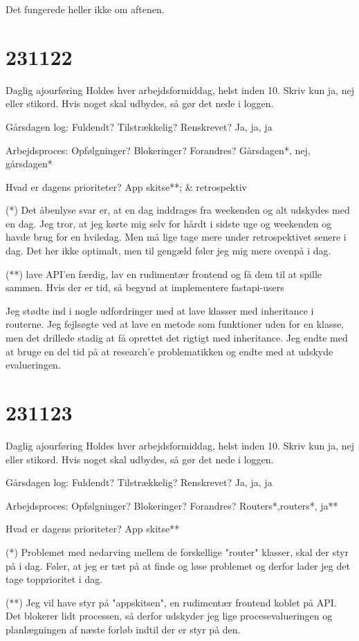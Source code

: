 \documentclass{report}
\begin{document}
Det fungerede heller ikke om aftenen.

\section{231122}
Daglig ajourføring
Holdes hver arbejdsformiddag, helst inden 10. Skriv kun ja, nej eller stikord. Hvis noget skal udbydes, så gør det nede i loggen.
 
Gårsdagen log: Fuldendt? Tilstrækkelig? Renskrevet?
Ja, ja, ja
 
Arbejdsproces: Opfølgninger? Blokeringer? Forandres?
Gårsdagen*, nej, gårsdagen*
 
Hvad er dagens prioriteter?
App skitse**; \& retrospektiv
 
(*) Det åbenlyse svar er, at en dag inddrages fra weekenden og alt udskydes med en dag.
Jeg tror, at jeg kørte mig selv for hårdt i sidste uge og weekenden og havde brug for en hviledag.
Men må lige tage mere under retrospektivet senere i dag.
Det her ikke optimalt, men til gengæld føler jeg mig mere ovenpå i dag.
 
(**) lave API'en færdig, lav en rudimentær frontend og få dem til at spille sammen.
Hvis der er tid, så begynd at implementere fastapi-users
 
Jeg stødte ind i nogle udfordringer med at lave klasser med inheritance i routerne. Jeg fejlsøgte ved at lave en metode som funktioner uden for en klasse, men det drillede stadig at få oprettet det rigtigt med inheritance.
Jeg endte med at bruge en del tid på at research'e problematikken og endte med at udskyde evalueringen.

\section{231123}
Daglig ajourføring
Holdes hver arbejdsformiddag, helst inden 10. Skriv kun ja, nej eller stikord. Hvis noget skal udbydes, så gør det nede i loggen.
 
Gårsdagen log: Fuldendt? Tilstrækkelig? Renskrevet?
Ja, ja, ja
 
Arbejdsproces: Opfølgninger? Blokeringer? Forandres?
Routers*,routers*, ja**
 
Hvad er dagens prioriteter?
App skitse**
 
(*) Problemet med nedarving mellem de forskellige "router" klasser, skal der styr på i dag. Føler, at jeg er tæt på at finde og løse problemet og derfor lader jeg det tage topprioritet i dag.
 
(**) Jeg vil have styr på "appskitsen", en rudimentær frontend koblet på API. Det blokerer lidt processen, så derfor udskyder jeg lige procesevalueringen og planlægningen af næste forløb indtil der er styr på den.
 
\end{document}
